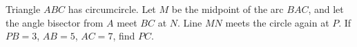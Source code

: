 Triangle $ABC$ has circumcircle. Let $M$ be the midpoint of the arc $BAC$, and let the angle bisector from $A$ meet $BC$ at $N$. Line $MN$ meets the circle again at $P$. If $PB=3$, $AB=5$, $AC=7$, find $PC$.
